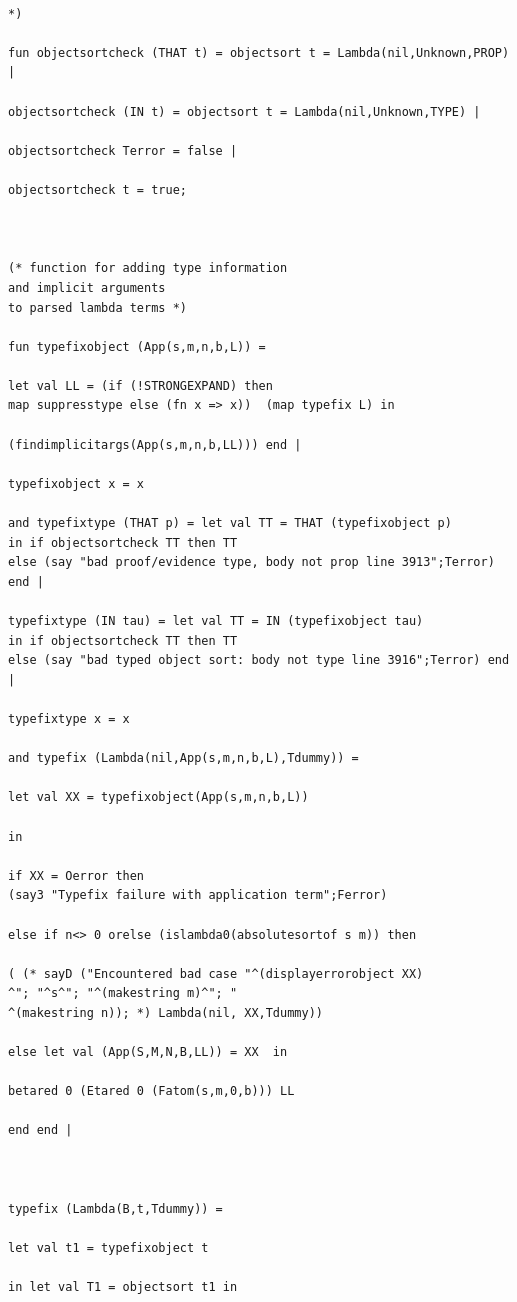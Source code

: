 \documentclass[12pt]{article}
\begin{document}
\begin{verbatim}

*)

fun objectsortcheck (THAT t) = objectsort t = Lambda(nil,Unknown,PROP) |

objectsortcheck (IN t) = objectsort t = Lambda(nil,Unknown,TYPE) |

objectsortcheck Terror = false |

objectsortcheck t = true;



(* function for adding type information 
and implicit arguments
to parsed lambda terms *)

fun typefixobject (App(s,m,n,b,L)) =

let val LL = (if (!STRONGEXPAND) then  
map suppresstype else (fn x => x))  (map typefix L) in

(findimplicitargs(App(s,m,n,b,LL))) end |

typefixobject x = x

and typefixtype (THAT p) = let val TT = THAT (typefixobject p) 
in if objectsortcheck TT then TT 
else (say "bad proof/evidence type, body not prop line 3913";Terror) end |

typefixtype (IN tau) = let val TT = IN (typefixobject tau) 
in if objectsortcheck TT then TT 
else (say "bad typed object sort: body not type line 3916";Terror) end |

typefixtype x = x 

and typefix (Lambda(nil,App(s,m,n,b,L),Tdummy)) =

let val XX = typefixobject(App(s,m,n,b,L)) 

in

if XX = Oerror then 
(say3 "Typefix failure with application term";Ferror)

else if n<> 0 orelse (islambda0(absolutesortof s m)) then

( (* sayD ("Encountered bad case "^(displayerrorobject XX)
^"; "^s^"; "^(makestring m)^"; "
^(makestring n)); *) Lambda(nil, XX,Tdummy))

else let val (App(S,M,N,B,LL)) = XX  in

betared 0 (Etared 0 (Fatom(s,m,0,b))) LL

end end |



typefix (Lambda(B,t,Tdummy)) = 

let val t1 = typefixobject t

in let val T1 = objectsort t1 in 


\end{verbatim}
\end{document}
